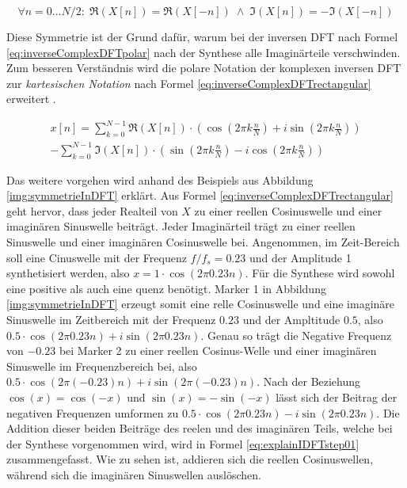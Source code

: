 \begin{equation}
\label{eq:symmetrieOfDFT}
\forall n = 0 \ldots N/2 : \; \Re (X[n]) = \Re(X[-n]) \; \wedge \; \Im (X[n]) = -\Im(X[-n]) 
\end{equation}

Diese Symmetrie ist der Grund dafür, warum bei der inversen DFT nach Formel \ref{eq:inverseComplexDFTpolar} nach der Synthese alle Imaginärteile verschwinden. Zum besseren Verständnis wird die polare Notation der komplexen inversen DFT zur \emph{kartesischen Notation} nach Formel \ref{eq:inverseComplexDFTrectangular} erweitert .\cite[S. 573]{dspGuide}

\begin{equation}
\begin{split}
x[n] =  \sum_{k = 0}^{N-1}  
\Re(X[n]) \cdot (\cos (2\pi k \frac{n}{N}) + i \sin (2 \pi k \frac{n}{N}) ) \\ 
- \sum_{k = 0}^{N-1}
\Im(X[n]) \cdot (\sin (2\pi k \frac{n}{N}) - i \cos(2 \pi k \frac{n}{N}) )
\end{split}
\label{eq:inverseComplexDFTrectangular}
\end{equation}

Das weitere vorgehen wird anhand des Beispiels aus Abbildung \ref{img:symmetrieInDFT}  erklärt. Aus Formel \ref{eq:inverseComplexDFTrectangular} geht  hervor, dass jeder Realteil von $X$ zu einer reellen Cosinuswelle und einer imaginären Sinuswelle beiträgt. Jeder Imaginärteil trägt zu einer reellen Sinuswelle und einer imaginären Cosinuswelle bei. Angenommen, im Zeit-Bereich soll eine Cinuswelle mit der Frequenz $f/f_s = 0.23$ und der Amplitude 1 synthetisiert werden, also $ x = 1 \cdot \cos(2  \pi 0.23 n)$. Für die Synthese wird sowohl eine positive als auch eine quenz benötigt. Marker 1 in Abbildung \ref{img:symmetrieInDFT} erzeugt somit eine relle Cosinuswelle und eine imaginäre Sinuswelle im Zeitbereich mit der Frequenz $0.23$ und der Ampltitude $0.5$, also $0.5 \cdot \cos(2  \pi 0.23 n) + i \sin(2  \pi 0.23 n)$. Genau so trägt die Negative Frequenz von $-0.23$ bei Marker 2 zu einer reellen Cosinus-Welle und einer imaginären Sinuswelle im Frequenzbereich bei, also $0.5 \cdot \cos(2  \pi (-0.23) n) + i \sin(2  \pi (-0.23) n)$. Nach der Beziehung $\cos(x) = \cos(-x) $ und $\sin(x) = -\sin(-x) $ lässt sich der Beitrag der negativen Frequenzen umformen zu $0.5 \cdot \cos(2  \pi 0.23 n) - i \sin(2  \pi 0.23 n)$. Die Addition dieser beiden Beiträge des reelen und des imaginären Teils, welche bei der Synthese vorgenommen wird, wird in Formel \ref{eq:explainIDFTstep01} zusammengefasst. Wie zu sehen ist, addieren sich die reellen Cosinuswellen, während sich die imaginären  Sinuswellen auslöschen. \cite[S. 573- 574]{dspGuide}

